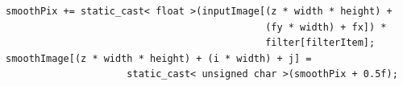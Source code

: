 \documentclass[a4paper]{article}
\begin{document}
\begin{lstlisting}[label=div2, caption=Unaligned accesses]
smoothPix += static_cast< float >(inputImage[(z * width * height) + 
                                             (fy * width) + fx]) * 
                                             filter[filterItem];
smoothImage[(z * width * height) + (i * width) + j] = 
                     static_cast< unsigned char >(smoothPix + 0.5f);
\end{lstlisting}
\FloatBarrier
\end{document}

